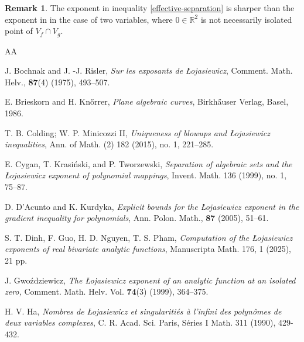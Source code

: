 \documentclass[reqno, 12pt ,a4letter]{amsart}
\theoremstyle{definition}
\newtheorem {remark}[theorem]{Remark}
\begin{document}
\begin{remark}
The exponent in inequality \eqref{effective-separation} is sharper than the exponent in \cite[Corollary 8]{Kurdyka2014} in the case of two variables, where $0 \in \mathbb{R}^2$ is not necessarily isolated point of $V_f \cap V_g$. 
\end{remark}



\begin{thebibliography}{AA}

J. Bochnak and J. -J. Risler, {\em Sur les exposants de {{\L}}ojasiewicz}, Comment. Math. Helv., {\bf 87}(4) (1975), 493--507.

E. Brieskorn and H. Kn\H{o}rrer, {\em Plane algebraic curves}, Birkh\H{a}user Verlag, Basel, 1986.

T. B. Colding; W. P. Minicozzi II, {\em Uniqueness of blowups and Łojasiewicz inequalities}, Ann. of Math. (2) 182 (2015), no. 1, 221–285.

E. Cygan, T. Krasiński, and P. Tworzewski, {\em Separation of algebraic sets and the Łojasiewicz exponent of polynomial mappings}, Invent. Math. 136 (1999), no. 1, 75–87.

D. D'Acunto and K. Kurdyka, {\em Explicit bounds for the {{\L}}ojasiewicz exponent in the gradient inequality for polynomials}, Ann. Polon. Math., {\bf 87} (2005), 51--61. 

S. T. Dinh, F. Guo, H. D. Nguyen, T. S. Pham, {\em Computation of the Łojasiewicz exponents of real bivariate analytic functions}, Manuscripta Math. 176, 1 (2025), 21 pp.

J. Gwo\'zdziewicz, {\em The \L ojasiewicz exponent of an analytic function at an isolated zero,} Comment. Math. Helv. Vol. {\bf 74}(3) (1999), 364--375.

H. V. Ha, {\em Nombres de \L ojasiewicz et singulariti\'{e}s \`{a} l'infini des polyn\^{o}mes de deux variables complexes}, C. R. Acad. Sci. Paris, S\'{e}ries I Math. 311 (1990), 429-432.


\end{thebibliography}
\end{document}
